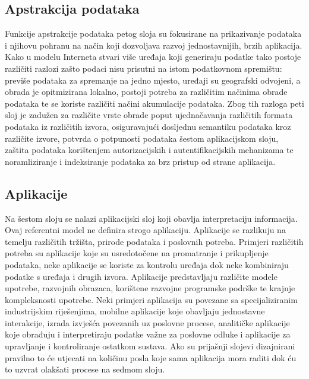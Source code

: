 \documentclass[times, utf8, diplomski]{fer}
\begin{document}
\subsection{Apstrakcija podataka}
Funkcije apstrakcije podataka petog sloja su fokusirane na prikazivanje podataka i njihovu pohranu na način koji dozvoljava razvoj jednostavnijih, brzih aplikacija. Kako u modelu Interneta stvari više uređaja koji generiraju podatke tako postoje različiti razlozi zašto podaci nisu prisutni na istom podatkovnom spremištu: previše podataka za spremanje na jedno mjesto, uređaji su geografski odvojeni, a obrada je opitmizirana lokalno, postoji potreba za različitim načinima obrade podataka te se koriste različiti načini akumulacije podataka. Zbog tih razloga peti sloj je zadužen za različite vrste obrade poput ujednačavanja različitih formata podataka iz različitih izvora, osiguravajući dosljednu semantiku podataka kroz različite izvore, potvrda o potpunosti podataka šestom aplikacijskom sloju, zaštita podataka korištenjem autorizacijskih i autentifikacijskih mehanizama te noramliziranje i indeksiranje podataka za brz pristup od strane aplikacija.

\subsection{Aplikacije}
Na šestom sloju se nalazi aplikacijski sloj koji obavlja interpretaciju informacija. Ovaj referentni model ne definira strogo aplikaciju. Aplikacije se razlikuju na temelju različitih tržišta, prirode podataka i poslovnih potreba. Primjeri različitih potreba su aplikacije koje su usredotočene na promatranje i prikupljenje podataka, neke aplikacije se koriste za kontrolu uređaja dok neke kombiniraju podatke s uređaja i drugih izvora. Aplikacije predstavljaju različite modele upotrebe, razvojnih obrazaca, korištene razvojne programske podrške te krajnje kompleksnosti upotrebe. Neki primjeri aplikacija su povezane sa specijaliziranim industrijskim riješenjima, mobilne aplikacije koje obavljaju jednostavne interakcije, izrada izvješća povezanih uz poslovne procese, analitičke aplikacije koje obrađuju i interpretiraju podatke važne za poslovne odluke i aplikacije za upravljanje i kontroliranje ostatkom sustava. Ako su prijašnji slojevi dizajnirani pravilno to će utjecati na količinu posla koje sama aplikacija mora raditi dok ću to uzvrat olakšati procese na sedmom sloju. 
\end{document}
